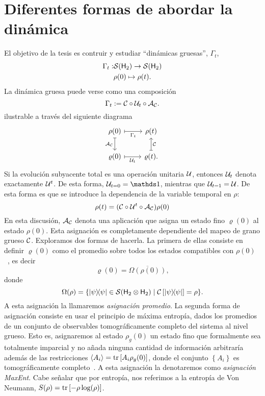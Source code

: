 \section{Diferentes formas de abordar la dinámica}
El objetivo de la tesis es contruir y estudiar ``dinámicas gruesas'', $\Gamma_t$,
\begin{align*}
\Gamma_{t}:&\mathcal{S}({\sf H}_2)\rightarrow \mathcal{S}({\sf H}_2)\\
&\rho(0) \mapsto \rho(t).
\end{align*}
La dinámica gruesa puede verse como una composición
\begin{equation*}
\Gamma_t:=\mathcal{C} \circ \mathcal{U}_t \circ \mathcal{A}_{\mathcal{C}}.
\end{equation*}
ilustrable a través del siguiente diagrama
\[\begin{tikzcd}[arrows={<-|}]
\rho(0)  & \rho(t) \arrow{l}{\Gamma_{t}} \arrow{d}{\mcC}\\
\varrho(0) \arrow{u}{\mcA_{\mcC}} & \varrho(t). \arrow{l}{\mcU_{t}}
\end{tikzcd}
\]
Si la evolución subyacente total es una operación unitaria $\mathcal{U}$, entonces $\mathcal{U}_{t}$  denota exactamente $\mathcal{U}^{t}$. De esta forma, $\mcU_{t=0}=\Id$, mientras que  $\mathcal{U}_{t=1}=\mathcal{U}$. De esta forma es que se introduce la dependencia de la variable temporal en $\rho$:
\begin{equation}\label{eq:TimeDepenenceUnitary}
\rho(t)=(\mathcal{C} \circ \mathcal{U}^{t} \circ \mathcal{A}_{\mathcal{C}})\rho(0)
\end{equation}
En esta discusión, $\mathcal{A}_{\mathcal{C}}$ denota una aplicación que asigna un estado fino $\varrho(0)$ al estado $\rho(0)$. Esta asignación es completamente dependiente del mapeo de grano grueso $\mathcal{C}$. Exploramos dos formas de hacerla. La primera de ellas consiste en definir $\varrho(0)$ como el promedio sobre todos los estados compatibles con $\rho(0)$~\cite{Macro-To-Micro}, es decir
$$\varrho(0)=\overline{\Omega(\rho(0))},$$
donde
\begin{equation*}
\Omega(\rho)=\{\dyad{\psi}\in \mcS(\hilbert_2 \otimes \hilbert_2) \mid \mcC\left[\dyad{\psi}\right]=\rho\}.
\end{equation*}
A esta asignación la llamaremos \textit{asignación promedio}. La segunda forma de asignación consiste en usar el principio de máxima entropía, dados los promedios de un conjunto de observables tomográficamente completo del sistema al nivel grueso. Esto es, asignaremos al estado $\rho_g(0)$ un estado fino que formalmente sea totalmente imparcial y no añada ninguna cantidad de información arbitraría además de las restricciones $\langle A_i \rangle=\tr \left[ A_i \rho_g(0) \right]$, donde el conjunto $\left\{A_i \right\}$ es tomográficamente completo~\cite{jaynes}. A esta asignación la denotaremos como \textit{asignación MaxEnt}. Cabe señalar que por entropía, nos referimos a la entropía de Von Neumann, $S(\rho)=\tr \left[ -\rho \log(\rho) \right]$.